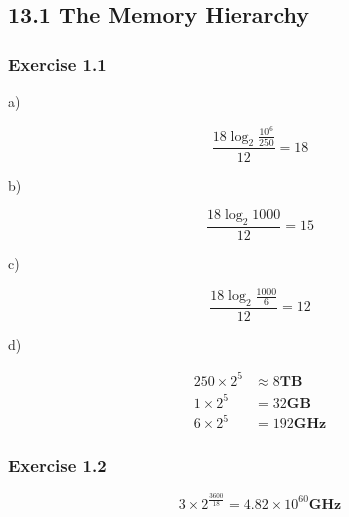 \documentclass[../../main.tex]{subfiles}
\begin{document}
\subsection{13.1 The Memory Hierarchy}

\subsubsection*{Exercise 1.1}

a)

$$
\frac{18 \log_{2}\frac{10^6}{250}}{12} = 18
$$

b)

$$
\frac{18 \log_{2}1000}{12} = 15
$$

c)

$$
\frac{18 \log_{2}\frac{1000}{6}}{12} = 12
$$

d)

\begin{align*}
  250 \times 2^5 &\approx 8 \mathbf{TB} \\
  1 \times 2^5 &= 32 \mathbf{GB} \\
  6 \times 2^5 &= 192 \mathbf{GHz}
\end{align*}

\subsubsection*{Exercise 1.2}

$$
3 \times 2^ {\frac{3600}{18}} = 4.82 \times 10^{60} \mathbf{GHz}
$$
\end{document}
